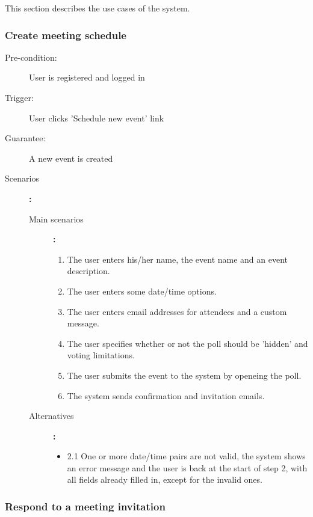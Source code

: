 \label{sec:usecases}
This section describes the use cases of the system.

\subsubsection{Create meeting schedule}

\begin{description}
	\item[Pre-condition:] User is registered and logged in
	\item[Trigger:] User clicks 'Schedule new event' link
	\item[Guarantee:] A new event is created
	\item[Scenarios]\textbf{:}\\
				\begin{description}
					\item[Main scenarios]\textbf{:}\\
								\begin{enumerate}
									\item The user enters his/her name, the event name and an event description.
									\item The user enters some date/time options.
									\item The user enters email addresses for attendees and a custom message.
									\item The user specifies whether or not the poll should be 'hidden' and voting limitations.
									\item The user submits the event to the system by openeing the poll.
									\item The system sends confirmation and invitation emails.
								\end{enumerate}
					\item[Alternatives]\textbf{:}\\
								\begin{itemize}
									\item 2.1 One or more date/time pairs are not valid, the system shows an error message and the user is back at the start of step 2, with all fields already filled in, except for the invalid ones.
								\end{itemize}
				\end{description}
\end{description}


\subsubsection{Respond to a meeting invitation}

